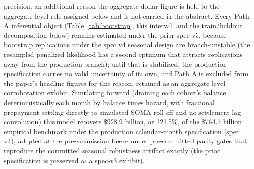 \documentclass[12pt]{article}
\begin{document}
precision, an additional reason the aggregate dollar figure is held to the aggregate-level role assigned below and is not carried in the abstract. Every Path A inferential object (Table~\ref{tab:bootstrap}, this interval, and the train/holdout decomposition below) remains estimated under the prior spec v3, because bootstrap replications under the spec v4 seasonal design are branch-unstable (the resampled penalized likelihood has a second optimum that attracts replications away from the production branch); until that is stabilized, the production specification carries no valid uncertainty of its own, and Path A is excluded from the paper's headline figures for this reason, retained as an aggregate-level corroboration exhibit. Simulating forward (draining each cohort's balance deterministically each month by balance times hazard, with fractional prepayment settling directly to simulated SOMA roll-off and no settlement-lag convolution) this model recovers \$928.9 billion, or 121.5\%, of the \$764.7 billion empirical benchmark under the production calendar-month specification (spec v4), adopted at the pre-submission freeze under pre-committed parity gates that reproduce the committed seasonal robustness artifact exactly (the prior specification is preserved as a spec-v3 exhibit).
\end{document}
